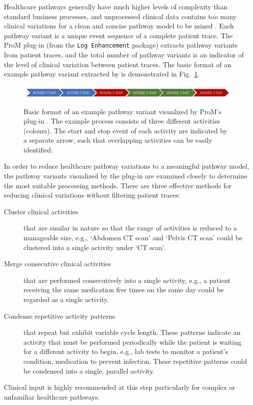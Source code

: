 Healthcare pathways generally have much higher levels of complexity than standard business processes, and unprocessed clinical data contains too many clinical variations for a clean and concise pathway model to be mined \cite{Huang2013, Veiga2010}. Each pathway variant is a unique event sequence of a complete patient trace. The ProM plug-in  (from the \texttt{Log Enhancement} package) extracts pathway variants from patient traces, and the total number of pathway variants is an indicator of the level of clinical variation between patient traces. The basic format of an example pathway variant extracted by  is demonstrated in  Fig.~\ref{fig:example pathway variant}.

\begin{figure}[t]
\centering
\includegraphics[width=\textwidth]{images/example_pathway_variant_format2.jpg}
\caption{
  Basic format of an example pathway variant visualized by
  ProM's plug-in .
  The example process   consists of three different activities
  (colours).
  The start and stop event of each activity are indicated by a
  separate arrow, such that overlapping activities can be easily identified.}
\label{fig:example pathway variant}
\end{figure}

In order to reduce healthcare pathway variations to a meaningful pathway model, the pathway variants visualized by the plug-in  are examined closely to determine the most suitable processing methods. 
There are three effective methods for reducing clinical variations without filtering patient traces:

\begin{description}
    \item[Cluster clinical activities] that are similar in nature so that the range of activities is reduced to a manageable size, e.g., `Abdomen CT scan' and `Pelvis CT scan' could be clustered into a single activity under `CT scan'.
    \item[Merge consecutive clinical activities] that are performed consecutively into a single activity, e.g., a patient receiving the same medication five times on the same day could be regarded as a single activity.
    \item[Condense repetitive activity patterns] 
         that repeat but exhibit variable cycle length. These patterns indicate an activity that must be performed periodically while the patient is waiting for a different activity to begin, e.g., lab tests to monitor a patient’s condition, medication to prevent infection. These repetitive patterns could be condensed into a single, parallel activity.
\end{description}
Clinical input is highly recommended at this step particularly for complex or unfamiliar healthcare pathways. 

